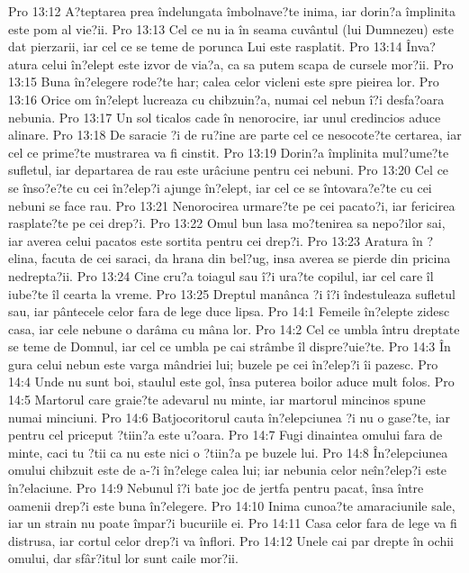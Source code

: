Pro 13:12  A?teptarea prea îndelungata îmbolnave?te inima, iar dorin?a împlinita este pom al vie?ii.
Pro 13:13  Cel ce nu ia în seama cuvântul (lui Dumnezeu) este dat pierzarii, iar cel ce se teme de porunca Lui este rasplatit.
Pro 13:14  Înva?atura celui în?elept este izvor de via?a, ca sa putem scapa de cursele mor?ii.
Pro 13:15  Buna în?elegere rode?te har; calea celor vicleni este spre pieirea lor.
Pro 13:16  Orice om în?elept lucreaza cu chibzuin?a, numai cel nebun î?i desfa?oara nebunia.
Pro 13:17  Un sol ticalos cade în nenorocire, iar unul credincios aduce alinare.
Pro 13:18  De saracie ?i de ru?ine are parte cel ce nesocote?te certarea, iar cel ce prime?te mustrarea va fi cinstit.
Pro 13:19  Dorin?a împlinita mul?ume?te sufletul, iar departarea de rau este urâciune pentru cei nebuni.
Pro 13:20  Cel ce se înso?e?te cu cei în?elep?i ajunge în?elept, iar cel ce se întovara?e?te cu cei nebuni se face rau.
Pro 13:21  Nenorocirea urmare?te pe cei pacato?i, iar fericirea rasplate?te pe cei drep?i.
Pro 13:22  Omul bun lasa mo?tenirea sa nepo?ilor sai, iar averea celui pacatos este sortita pentru cei drep?i.
Pro 13:23  Aratura în ?elina, facuta de cei saraci, da hrana din bel?ug, insa averea se pierde din pricina nedrepta?ii.
Pro 13:24  Cine cru?a toiagul sau î?i ura?te copilul, iar cel care îl iube?te îl cearta la vreme.
Pro 13:25  Dreptul manânca ?i î?i îndestuleaza sufletul sau, iar pântecele celor fara de lege duce lipsa.
Pro 14:1  Femeile în?elepte zidesc casa, iar cele nebune o darâma cu mâna lor.
Pro 14:2  Cel ce umbla întru dreptate se teme de Domnul, iar cel ce umbla pe cai strâmbe îl dispre?uie?te.
Pro 14:3  În gura celui nebun este varga mândriei lui; buzele pe cei în?elep?i îi pazesc.
Pro 14:4  Unde nu sunt boi, staulul este gol, însa puterea boilor aduce mult folos.
Pro 14:5  Martorul care graie?te adevarul nu minte, iar martorul mincinos spune numai minciuni.
Pro 14:6  Batjocoritorul cauta în?elepciunea ?i nu o gase?te, iar pentru cel priceput ?tiin?a este u?oara.
Pro 14:7  Fugi dinaintea omului fara de minte, caci tu ?tii ca nu este nici o ?tiin?a pe buzele lui.
Pro 14:8  În?elepciunea omului chibzuit este de a-?i în?elege calea lui; iar nebunia celor neîn?elep?i este în?elaciune.
Pro 14:9  Nebunul î?i bate joc de jertfa pentru pacat, însa între oamenii drep?i este buna în?elegere.
Pro 14:10  Inima cunoa?te amaraciunile sale, iar un strain nu poate împar?i bucuriile ei.
Pro 14:11  Casa celor fara de lege va fi distrusa, iar cortul celor drep?i va înflori.
Pro 14:12  Unele cai par drepte în ochii omului, dar sfâr?itul lor sunt caile mor?ii.
